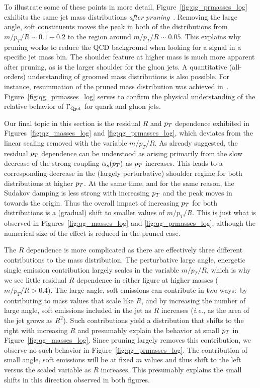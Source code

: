 To illustrate some of these points in more detail, Figure~\ref{fig:qg_prmasses_log} exhibits the same jet mass distributions  
\textit{after pruning}~\cite{Ellis:2009me,Ellis:2009su}.  Removing the large angle,  soft constituents
moves the peak in both of the distributions from  $m/p_T/R \sim 0.1 - 0.2$ to the region around $m/p_T/R \sim 0.05$.  This explains why pruning works to reduce the
QCD background when looking for a signal in a specific jet mass bin.  The shoulder feature at higher mass is much more apparent after pruning, as is the larger shoulder for
the gluon jets.  A quantitative (all-orders) understanding of groomed mass distributions is also possible. For instance, resummation of the pruned mass distribution was achieved in~\cite{Dasgupta:2013ihk,Dasgupta:2013via}. Figure~\ref{fig:qg_prmasses_log} serves to confirm the physical understanding of the relative behavior of $\Gamma_{\rm Qjet}$ for quark and gluon jets.

Our final topic in this section is the residual $R$ and $p_T$ dependence exhibited in Figures~\ref{fig:qg_masses_log} and \ref{fig:qg_prmasses_log}, which
deviates from the linear scaling removed with the variable $m/p_T/R$.  As already suggested, the residual $p_T$ dependence can be understood as arising primarily from the slow decrease of the strong coupling $\alpha_s(p_T)$ as $p_T$ increases.  This leads to a corresponding decrease in the (largely perturbative) shoulder regime for both distributions
at higher $p_T$.  At the same time, and for the same reason, the Sudakov damping is less strong with increasing $p_T$ and the peak moves in towards the origin.
Thus the overall impact of increasing $p_T$ for both distributions is a (gradual) shift to smaller values of $m/p_T/R$.  This is just what is observed in 
Figures~\ref{fig:qg_masses_log} and \ref{fig:qg_prmasses_log}, although the numerical size of the effect is reduced in the pruned case.

The $R$ dependence is more complicated as there are effectively three different contributions to the mass distribution.  
The perturbative large angle, energetic single emission contribution
largely scales in the variable $m/p_T/R$, which is why we see little residual $R$ dependence in either figure at higher masses ($m/p_T/R > 0.4$).  
The large angle, soft emissions can  contribute in two ways:~by contributing to mass values that scale like $R$, and by increasing the number of large angle, soft emissions included in the jet as $R$ increases (\textit{i.e.}, as the area of the jet grows as $R^2$).  Such contributions  yield
a distribution that shifts to the right with increasing $R$  and presumably explain the behavior at small $p_T$ in Figure~\ref{fig:qg_masses_log}.  Since pruning
largely removes this contribution, we observe no such behavior in Figure~\ref{fig:qg_prmasses_log}.  The contribution of small angle, soft emissions will be at
fixed $m$ values and thus shift to the left versus the scaled variable as $R$ increases.  
This presumably explains the small shifts in this direction observed in both figures.

